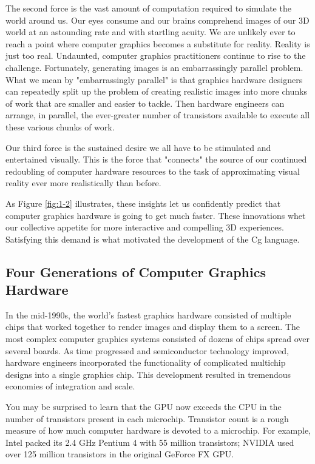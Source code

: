 \documentclass{book}
\begin{document}
The second force is the vast amount of computation required to simulate the world around us. Our eyes consume and our brains comprehend images of our 3D world at an astounding rate and with startling acuity. We are unlikely ever to reach a point where computer graphics becomes a substitute for reality. Reality is just too real. Undaunted, computer graphics practitioners continue to rise to the challenge. Fortunately, generating images is an embarrassingly parallel problem. What we mean by "embarrassingly parallel" is that graphics hardware designers can repeatedly split up the problem of creating realistic images into more chunks of work that are smaller and easier to tackle. Then hardware engineers can arrange, in parallel, the ever-greater number of transistors available to execute all these various chunks of work.

Our third force is the sustained desire we all have to be stimulated and entertained visually. This is the force that "connects" the source of our continued redoubling of computer hardware resources to the task of approximating visual reality ever more realistically than before.

As Figure \ref{fig:1-2} illustrates, these insights let us confidently predict that computer graphics hardware is going to get much faster. These innovations whet our collective appetite for more interactive and compelling 3D experiences. Satisfying this demand is what motivated the development of the Cg language.

\subsection{Four Generations of Computer Graphics Hardware}

In the mid-1990s, the world's fastest graphics hardware consisted of multiple chips that worked together to render images and display them to a screen. The most complex computer graphics systems consisted of dozens of chips spread over several boards. As time progressed and semiconductor technology improved, hardware engineers incorporated the functionality of complicated multichip designs into a single graphics chip. This development resulted in tremendous economies of integration and scale.

You may be surprised to learn that the GPU now exceeds the CPU in the number of transistors present in each microchip. Transistor count is a rough measure of how much computer hardware is devoted to a microchip. For example, Intel packed its 2.4 GHz Pentium 4 with 55 million transistors; NVIDIA used over 125 million transistors in the original GeForce FX GPU.
\end{document}
